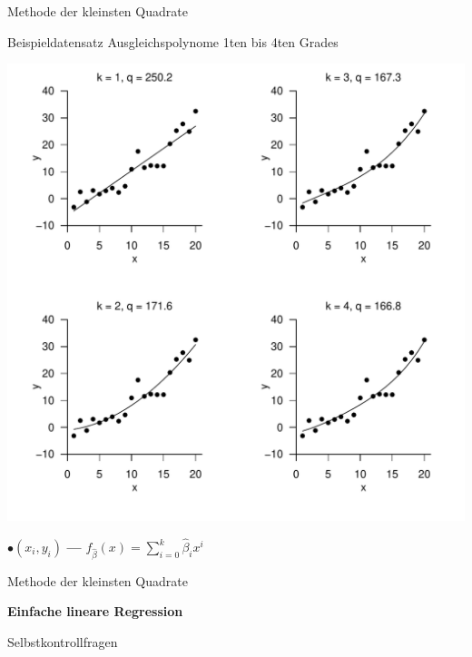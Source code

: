 \documentclass[
  8pt,
  ignorenonframetext,
]{beamer}
\begin{document}
\begin{frame}{Methode der kleinsten Quadrate}
\protect\hypertarget{methode-der-kleinsten-quadrate-18}{}
\small

Beispieldatensatz Ausgleichspolynome 1ten bis 4ten Grades

\footnotesize

\begin{center}\includegraphics[width=0.6\linewidth]{1_Abbildungen/alm_1_ausgleichspolynom} \end{center}
\vspace{-4mm}
\footnotesize
\center

\(\bullet (x_i, y_i)\) \hspace{2mm} \textbf{---}
\(f_{\hat{\beta}}(x) = \sum_{i=0}^k \hat{\beta}_i x^{i}\)
\end{frame}

\begin{frame}{}
\protect\hypertarget{section-4}{}
\vfill
\large

Methode der kleinsten Quadrate

\textbf{Einfache lineare Regression}

Selbstkontrollfragen

\vfill
\end{frame}
\end{document}
